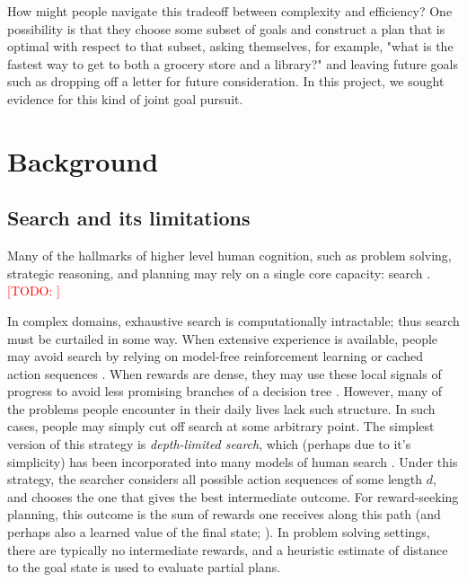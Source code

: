 \documentclass[10pt,letterpaper]{article}
\newcommand{\todo}[1]{\textcolor{red}{\textsc{[TODO: #1]}}}
\begin{document}
How might people navigate this tradeoff between complexity and efficiency? One possibility is that they choose some subset of goals and construct a plan that is optimal with respect to that subset, asking themselves, for example, "what is the fastest way to get to both a grocery store and a library?" and leaving future goals such as dropping off a letter for future consideration. In this project, we sought evidence for this kind of joint goal pursuit.

\section{Background}

\subsection{Search and its limitations}

Many of the hallmarks of higher level human cognition, such as problem solving, strategic reasoning, and planning may rely on a single core capacity: search \cite{NewellSimon1972}. \todo{}

In complex domains, exhaustive search is computationally intractable; thus search must be curtailed in some way. When extensive experience is available, people may avoid search by relying on model-free reinforcement learning \citep{Keramati2011,Kool2017} or cached action sequences \citep{Huys2015}. When rewards are dense, they may use these local signals of progress to avoid less promising branches of a decision tree \citep{Huys2012}. However, many of the problems people encounter in their daily lives lack such structure. In such cases, people may simply cut off search at some arbitrary point. The simplest version of this strategy is \textit{depth-limited search}, which (perhaps due to it's simplicity) has been incorporated into many models of human search \citep{MacGregor2001,Keramati2016,Krusche2018}. Under this strategy, the searcher considers all possible action sequences of some length $d$, and chooses the one that gives the best intermediate outcome. For reward-seeking planning, this outcome is the sum of rewards one receives along this path (and perhaps also a learned value of the final state; \citealp{Keramati2016}). In problem solving settings, there are typically no intermediate rewards, and a heuristic estimate of distance to the goal state is used to evaluate partial plans.


\end{document}

